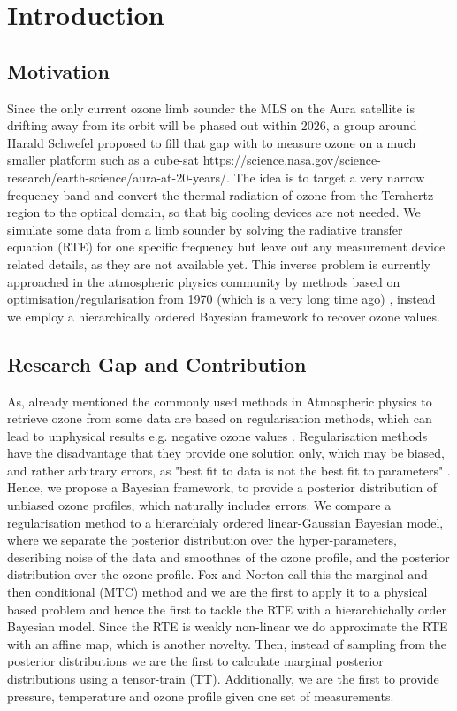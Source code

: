 \chapter{Introduction}
\section{Motivation}

Since the only current ozone limb sounder the MLS on the Aura satellite is drifting away from its orbit will be phased out within 2026, a group around Harald Schwefel proposed to fill that gap with to measure ozone on a much smaller platform such as a cube-sat  https://science.nasa.gov/science-research/earth-science/aura-at-20-years/. \cite{ustin2024current}
The idea is to target a very narrow frequency band and convert the thermal radiation of ozone from the Terahertz region to the optical domain, so that big cooling devices are not needed.
We simulate some data from a limb sounder by solving the radiative transfer equation (RTE) for one specific frequency but leave out any measurement device related details, as they are not available yet.
This inverse problem is currently approached in the atmospheric physics community by methods based on optimisation/regularisation from 1970 (which is a very long time ago) \cite{}, instead we employ a hierarchically ordered Bayesian framework to recover ozone values.


\section{Research Gap and Contribution}
As, already mentioned the commonly used methods in Atmospheric physics to retrieve ozone from some data are based on regularisation methods, which can lead to unphysical results e.g. negative ozone values \cite{MLSdata}.
Regularisation methods have the disadvantage that they provide one solution only, which may be biased, and rather arbitrary errors, as "best fit to data is not the best fit to parameters" \cite{tan2016LecNot}.
Hence, we propose a Bayesian framework, to provide a posterior distribution of unbiased ozone profiles, which naturally includes errors.
We compare a regularisation method to a hierarchialy ordered linear-Gaussian Bayesian model, where we separate the posterior distribution over the hyper-parameters, describing noise of the data and smoothnes of the ozone profile, and the posterior distribution over the ozone profile.
Fox and Norton call this the marginal and then conditional (MTC) method \cite{} and we are the first to apply it to a physical based problem and hence the first to tackle the RTE with a hierarchichally order Bayesian model.
Since the RTE is weakly non-linear we do approximate the RTE with an affine map, which is another novelty.
Then, instead of sampling from the posterior distributions we are the first to calculate marginal posterior distributions using a tensor-train (TT).
Additionally, we are the first to provide pressure, temperature and ozone profile given one set of measurements.

